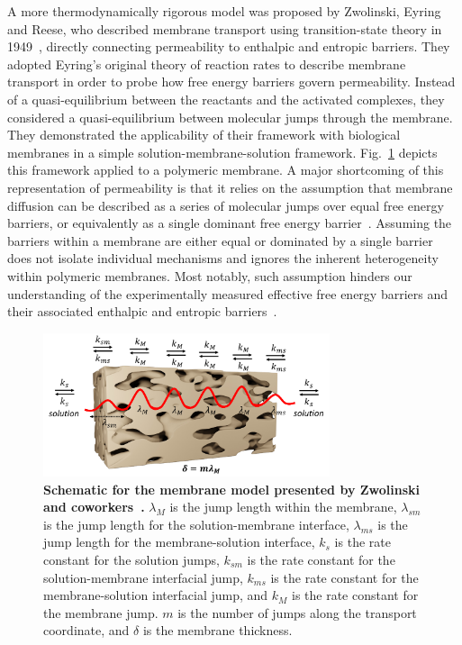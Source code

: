\documentclass[12pt]{article}
\begin{document}
A more thermodynamically rigorous model was proposed by Zwolinski, Eyring and Reese, who described membrane transport using transition-state theory in 1949~\cite{zwolinski_diffusion_1949}, directly connecting permeability to enthalpic and entropic barriers. They adopted Eyring's original theory of reaction rates to describe membrane transport in order to probe how free energy barriers govern permeability. Instead of a quasi-equilibrium between the reactants and the activated complexes, they considered a quasi-equilibrium between molecular jumps through the membrane. They demonstrated the applicability of their framework with biological membranes in a simple solution-membrane-solution framework. Fig.~\ref{fig:membrane_illustration} depicts this framework applied to a polymeric membrane. A major shortcoming of this representation of permeability is that it relies on the assumption that membrane diffusion can be described as a series of molecular jumps over equal free energy barriers, or equivalently as a single dominant free energy barrier~\cite{del_castillo_energy-barrier_1979,sigurdardottir_energy_2020,zhou_intrapore_2020}. Assuming the barriers within a membrane are either equal or dominated by a single barrier does not isolate individual mechanisms and ignores the inherent heterogeneity within polymeric membranes. Most notably, such assumption hinders our understanding of the experimentally measured effective free energy barriers and their associated enthalpic and entropic barriers~\cite{richards_experimental_2013,epsztein_role_2018,shefer_enthalpic_2021}. 

\begin{figure}[ht]
    \centering
    \includegraphics[width=0.75\textwidth]{figures/labeled_realistic_membrane.pdf}
    \caption{\textbf{Schematic for the membrane model presented by Zwolinski and coworkers~\cite{zwolinski_diffusion_1949}.} $\lambda_{M}$ is the jump length within the membrane, $\lambda_{sm}$ is the jump length for the solution-membrane interface, $\lambda_{ms}$ is the jump length for the membrane-solution interface, $k_s$ is the rate constant for the solution jumps, $k_{sm}$ is the rate constant for the solution-membrane interfacial jump, $k_{ms}$ is the rate constant for the membrane-solution interfacial jump, and $k_M$ is the rate constant for the membrane jump. $m$ is the number of jumps along the transport coordinate, and $\delta$ is the membrane thickness.}
    \label{fig:membrane_illustration}
\end{figure}
\end{document}
